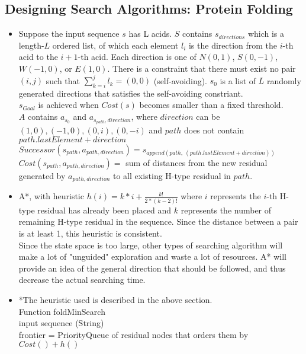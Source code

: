 \documentclass[11pt]{article}
\begin{document}
\begin{onehalfspace}
    \section{Designing Search Algorithms: Protein Folding}
    \begin{itemize}
    \item
    Suppose the input sequence $s$ has L acids.
    $S$ contains $s_{directions}$ which is a length-$L$ ordered list, of which each element $l_i$ is the direction from the $i$-th acid to the $i+1$-th acid. Each direction is one of $N(0,1)$, $S(0,-1)$, $W(-1,0)$, or $E(1,0)$. There is a constraint that there must exist no pair $(i, j)$ such that $\sum_{k=i}^j l_k = (0,0)$ (self-avoiding).
    $s_0$ is a list of $L$ randomly generated directions that satisfies the self-avoiding constriant.\\
    $s_{Goal}$ is achieved when $Cost(s)$ becomes smaller than a fixed threshold. \\
    $A$ contains $a_{s_0}$ and $a_{s_{path}, direction}$, where $direction$ can be $(1, 0), (-1, 0), (0, i), (0, -i)$ and $path$ does not contain $path.lastElement + direction$ \\
    $Successor(s_{path}, a_{path, direction}) = s_{append(path,\: (path.lastElement + direction))}$ \\
    $Cost(s_{path}, a_{path, direction}) =$ sum of distances from the new residual generated by $a_{path, direction}$ to all existing H-type residual in $path$.
    \item
    A*, with heuristic $h(i) = k * i + \frac{k!}{2 * (k-2)!}$ where $i$ represents the $i$-th H-type residual has already been placed and $k$ represents the number of remaining H-type residual in the sequence. Since the distance between a pair is at least 1, this heuristic is consistent.\\
    Since the state space is too large, other types of searching algorithm will make a lot of "unguided" exploration and waste a lot of resources. A* will provide an idea of the general direction that should be followed, and thus decrease the actual searching time.
    \item
    \newcommand\tab[1][1cm]{\hspace*{#1}}
    *The heuristic used is described in the above section.\\
    Function foldMinSearch \\
    \tab input sequence (String) \\
    \tab frontier = PriorityQueue of residual nodes that orders them by $Cost() + h()$ \\

\end{itemize}
\end{onehalfspace}
\end{document}
